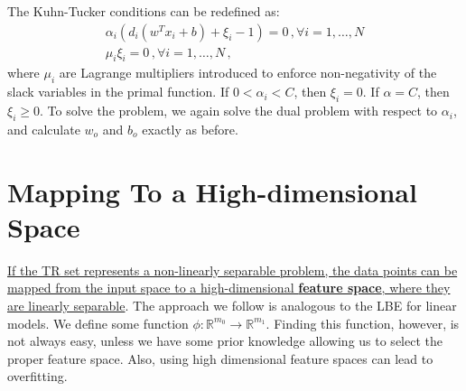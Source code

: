 The Kuhn-Tucker conditions can be redefined as:
\begin{gather*}
    \alpha_i (d_i (w^T x_i + b) + \xi_i - 1) = 0 \, , \forall i = 1, \dots , N \\
    \mu_i \xi_i = 0 \,, \forall i = 1, \dots , N \, ,
\end{gather*}
where $\mu_i$ are Lagrange multipliers introduced to enforce non-negativity of the slack variables in the primal function. If $0 < \alpha_i < C$, then $\xi_i = 0$. If $\alpha = C$, then $\xi_i \geq 0$. To solve the problem, we again solve the dual problem with respect to $\alpha_i$, and calculate $w_o$ and $b_o$ exactly as before.

\section{Mapping To a High-dimensional Space}

\href{https://en.wikipedia.org/wiki/Cover%27s_theorem#The_Theorem}{If the TR set represents a non-linearly separable problem, the data points can be mapped from the input space to a high-dimensional \textbf{feature space}, where they are linearly separable}. The approach we follow is analogous to the LBE for linear models. We define some function $\phi : \mathbb{R}^{m_0}\xrightarrow{} \mathbb{R}^{m_1}$. Finding this function, however, is not always easy, unless we have some prior knowledge allowing us to select the proper feature space. Also, using high dimensional feature spaces can lead to overfitting.

